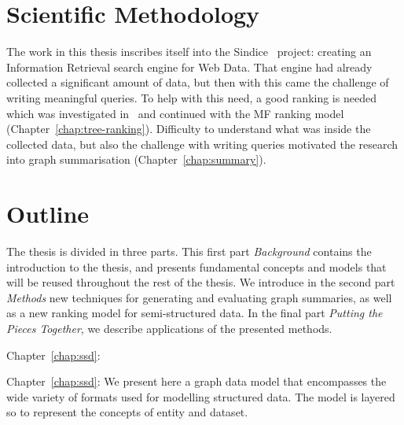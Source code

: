 \section{Scientific Methodology}

The work in this thesis inscribes itself into the Sindice~\cite{delbru:jws:entity} project: creating an Information Retrieval search engine for Web Data. That engine had already collected a significant amount of data, but then with this came the challenge of writing meaningful queries. To help with this need, a good ranking is needed which was investigated in~\cite{delbru:2010:hierarchical} and continued with the MF ranking model (Chapter~\ref{chap:tree-ranking}). Difficulty to understand what was inside the collected data, but also the challenge with writing queries motivated the research into graph summarisation (Chapter~\ref{chap:summary}).

\section{Outline}

The thesis is divided in three parts. This first part \emph{Background} contains the introduction to the thesis, and presents fundamental concepts and models that will be reused throughout the rest of the thesis. We introduce in the second part \emph{Methods} new techniques for generating and evaluating graph summaries, as well as a new ranking model for semi-structured data. In the final part \emph{Putting the Pieces Together}, we describe applications of the presented methods.


\begin{labeling}{Chapter~\ref{chap:ssd}:}
\item[Chapter~\ref{chap:ssd}:] We present here a graph data model that encompasses the wide variety of formats used for modelling structured data. The model is layered so to represent the concepts of entity and dataset.%
\end{labeling}


